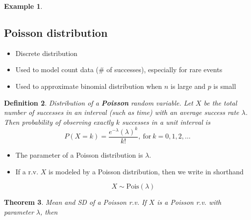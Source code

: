 \documentclass[12pt]{amsart}
\newtheorem{theorem}{Theorem}[section]
\newtheorem{definition}[theorem]{Definition}
\newtheorem{example}[theorem]{Example}
\begin{document}
{\begin{example}
\begin{enumerate}
\color{black}

\end{enumerate}

\end{example} 


\newpage
\subsection{Poisson distribution}

\vspace{.5cm}

\begin{itemize}
\item Discrete distribution
\item Used to model count data (\# of successes), especially for rare events
\item Used to approximate binomial distribution when $n$ is large and $p$ is small
\end{itemize}

\vspace{.5cm}

\begin{definition}{Distribution of a \textbf{Poisson} random variable.} \newline
Let $X$ be the total number of successes in an interval (such as time) with an average success rate $\lambda$. \newline
Then probability of observing exactly $k$ successes in a unit interval is
\color{blue}
$$
P(X = k) = \frac{e^{-\lambda}(\lambda)^{k}}{k!},~\textrm{for}~ k = 0, 1, 2, \dots
$$
\color{black}
\vspace{1cm}
\end{definition}


\begin{itemize}
\item The parameter of a Poisson distribution is $\lambda$. 
\item If a r.v. $X$ is modeled by a Poisson distribution, then we write in shorthand  

\color{blue}
$$X \sim \textrm{Pois}(\lambda)$$
\color{black}
\end{itemize}

\begin{theorem}{Mean and SD of a Poisson r.v.} \newline
If $X$ is a Poisson r.v. with parameter $\lambda$, then 


\end{theorem}}
\end{document}
